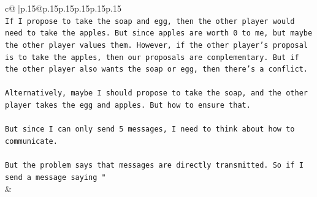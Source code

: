 \documentclass{article}
\begin{document}
{\begin{supertabular}{c@{$\;$}|p{.15\linewidth}@{}p{.15\linewidth}p{.15\linewidth}p{.15\linewidth}p{.15\linewidth}p{.15\linewidth}}
{{{\\ 
\texttt{If I propose to take the soap and egg, then the other player would need to take the apples. But since apples are worth 0 to me, but maybe the other player values them. However, if the other player's proposal is to take the apples, then our proposals are complementary. But if the other player also wants the soap or egg, then there's a conflict. } \\
\\ 
\texttt{Alternatively, maybe I should propose to take the soap, and the other player takes the egg and apples. But how to ensure that. } \\
\\ 
\texttt{But since I can only send 5 messages, I need to think about how to communicate. } \\
\\ 
\texttt{But the problem says that messages are directly transmitted. So if I send a message saying "} \\
            }
        }
    }
    & \\ \\


\end{supertabular}}
\end{document}
